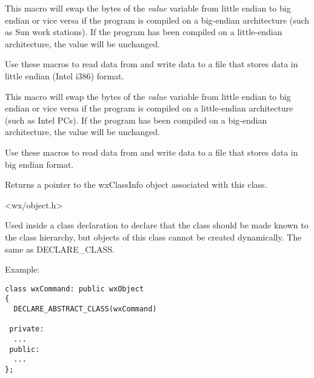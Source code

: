 

This macro will swap the bytes of the {\it value} variable from little
endian to big endian or vice versa if the program is compiled on a
big-endian architecture (such as Sun work stations). If the program has
been compiled on a little-endian architecture, the value will be unchanged.

Use these macros to read data from and write data to a file that stores
data in little endian (Intel i386) format.

\label{intswaponle}





This macro will swap the bytes of the {\it value} variable from little
endian to big endian or vice versa if the program is compiled on a
little-endian architecture (such as Intel PCs). If the program has
been compiled on a big-endian architecture, the value will be unchanged.

Use these macros to read data from and write data to a file that stores
data in big endian format.

\label{classinfo}


Returns a pointer to the wxClassInfo object associated with this class.


<wx/object.h>



Used inside a class declaration to declare that the class should be
made known to the class hierarchy, but objects of this class cannot be created
dynamically. The same as DECLARE\_CLASS.

Example:

\begin{verbatim}
class wxCommand: public wxObject
{
  DECLARE_ABSTRACT_CLASS(wxCommand)

 private:
  ...
 public:
  ...
};
\end{verbatim}

